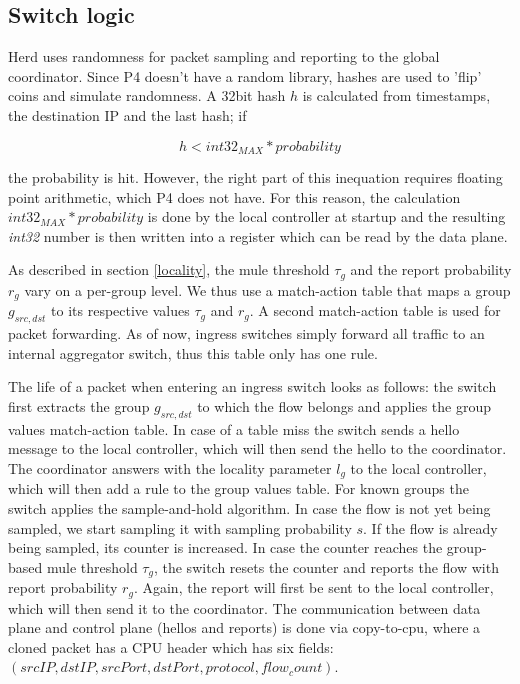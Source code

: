 \documentclass[11pt,oneside,a4paper]{article}
\begin{document}

\subsection{Switch logic} \label{switch}
Herd uses randomness for packet sampling and reporting to the global coordinator. Since P4 doesn't have a random library, hashes are used to 'flip' coins and simulate randomness. A  32bit hash $h$ is calculated from timestamps, the destination IP and the last hash; if 

$$h < int32_{MAX} * probability$$

\noindent the probability is hit. However, the right part of this inequation requires floating point arithmetic, which P4 does not have. For this reason, the calculation $int32_{MAX} * probability$ is done by the local controller at startup and the resulting \textit{int32} number is then written into a register which can be read by the data plane.

As described in section \ref{locality}, the mule threshold $\tau_g$ and the report probability $r_g$ vary on a per-group level. We thus use a match-action table that maps a group $g_{src,dst}$ to its respective values $\tau_g$ and $r_g$. A second match-action table is used for packet forwarding. As of now, ingress switches simply forward all traffic to an internal aggregator switch, thus this table only has one rule.

The life of a packet when entering an ingress switch looks as follows: the switch first extracts the group $g_{src,dst}$ to which the flow belongs and applies the group values match-action table. In case of a table miss the switch sends a hello message to the local controller, which will then send the hello to the coordinator. The coordinator answers with the locality parameter $l_g$ to the local controller, which will then add a rule to the group values table. For known groups the switch applies the sample-and-hold algorithm. In case the flow is not yet being sampled, we start sampling it with sampling probability $s$. If the flow is already being sampled, its counter is increased. In case the counter reaches the group-based mule threshold $\tau_g$, the switch resets the counter and reports the flow with report probability $r_g$. Again, the report will first be sent to the local controller, which will then send it to the coordinator. The communication between data plane and control plane (hellos and reports) is done via copy-to-cpu, where a cloned packet has a CPU header which has six fields: $(srcIP, dstIP, srcPort, dstPort, protocol, flow_count)$.
\end{document}
